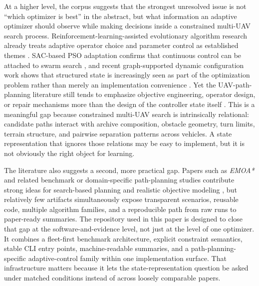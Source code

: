 \documentclass[a4paper,fleqn]{cas-dc}
\begin{document}
At a higher level, the corpus suggests that the strongest unresolved issue is not ``which optimizer is best'' in the abstract, but what information an adaptive optimizer should observe while making decisions inside a constrained multi-UAV search process. Reinforcement-learning-assisted evolutionary algorithm research already treats adaptive operator choice and parameter control as established themes \cite{ref3,ref5}. SAC-based PSO adaptation confirms that continuous control can be attached to swarm search \cite{ref4}, and recent graph-supported dynamic configuration work shows that structured state is increasingly seen as part of the optimization problem rather than merely an implementation convenience \cite{ref6}. Yet the UAV-path-planning literature still tends to emphasize objective engineering, operator design, or repair mechanisms more than the design of the controller state itself \cite{ref15,ref16,ref17,ref18,ref19,ref20}. This is a meaningful gap because constrained multi-UAV search is intrinsically relational: candidate paths interact with archive composition, obstacle geometry, turn limits, terrain structure, and pairwise separation patterns across vehicles. A state representation that ignores those relations may be easy to implement, but it is not obviously the right object for learning.

The literature also suggests a second, more practical gap. Papers such as \textit{EMOA*} and related benchmark or domain-specific path-planning studies contribute strong ideas for search-based planning and realistic objective modeling \cite{ref20,ref21,ref23}, but relatively few artifacts simultaneously expose transparent scenarios, reusable code, multiple algorithm families, and a reproducible path from raw runs to paper-ready summaries. The repository used in this paper is designed to close that gap at the software-and-evidence level, not just at the level of one optimizer. It combines a fleet-first benchmark architecture, explicit constraint semantics, stable CLI entry points, machine-readable summaries, and a path-planning-specific adaptive-control family within one implementation surface. That infrastructure matters because it lets the state-representation question be asked under matched conditions instead of across loosely comparable papers.
\end{document}
